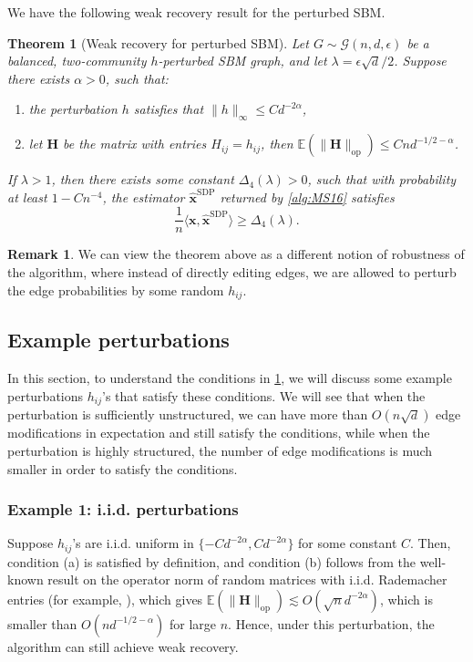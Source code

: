 \documentclass[11pt, titlepage]{article} %
\numberwithin{equation}{section}
\newtheorem{theorem}{Theorem}
\theoremstyle{definition}
\newtheorem{remark}{Remark}
\numberwithin{theorem}{section}
\numberwithin{lemma}{section}
\numberwithin{corollary}{section}
\numberwithin{proposition}{section}
\numberwithin{definition}{section}
\numberwithin{remark}{section}
\begin{document}
We have the following weak recovery result for the perturbed SBM.
\begin{theorem}[Weak recovery for perturbed SBM]
\label{thm:perturbed.SBM}
Let $G \sim \mathcal{G}(n, d, \epsilon)$ be a balanced, two-community $h$-perturbed SBM graph,
and let $\lambda = \epsilon \sqrt{d} / 2$. Suppose there exists $\alpha > 0$, such that:
\begin{enumerate}
  \item[(a)] the perturbation $h$ satisfies that $\|h\|_\infty \leq C d^{-2\alpha}$,
  \item[(b)] let $\bm{H}$ be the matrix with entries $H_{ij} = h_{ij}$, 
  then $\mathbb{E}(\|\bm{H}\|_\text{op}) \leq Cnd^{-1/2 - \alpha}$.
\end{enumerate}
If $\lambda > 1$, then there exists some constant $\Delta_4(\lambda) > 0$, such that with probability
at least $1 - Cn^{-4}$, the estimator $\hat{\bm{x}}^\mathrm{SDP}$ returned by \cref{alg:MS16} satisfies
\[
\frac{1}{n} \langle \bm{x}, \hat{\bm{x}}^\mathrm{SDP} \rangle \geq \Delta_4(\lambda).
\]
\end{theorem}
\begin{remark}
We can view the theorem above as a different notion of robustness of the algorithm, where instead of
directly editing edges, we are allowed to perturb the edge probabilities by some random $h_{ij}$.
\end{remark}

\subsection{Example perturbations}
In this section, to understand the conditions in \cref{thm:perturbed.SBM}, we will discuss some
example perturbations $h_{ij}$'s that satisfy these conditions. We will see that when the perturbation
is sufficiently unstructured, we can have more than $O(n\sqrt{d})$ edge modifications in expectation
and still satisfy the conditions, while when the perturbation is highly structured, the number
of edge modifications is much smaller in order to satisfy the conditions.

\subsubsection{Example 1: i.i.d. perturbations}
Suppose $h_{ij}$'s are i.i.d. uniform in $\{-Cd^{-2\alpha}, Cd^{-2\alpha}\}$ for some constant $C$.
Then, condition (a) is satisfied by definition, and condition (b) follows from the well-known result
on the operator norm of random matrices with i.i.d. Rademacher entries (for example, \cite[Theorem 4.4.3]{Ver18}),
which gives $\mathbb{E}(\|\bm{H}\|_\text{op}) \lesssim O(\sqrt{n}d^{-2\alpha})$, which is smaller than
$O(nd^{-1/2 - \alpha})$ for large $n$. Hence, under this perturbation, the algorithm can still 
achieve weak recovery.
\end{document}
